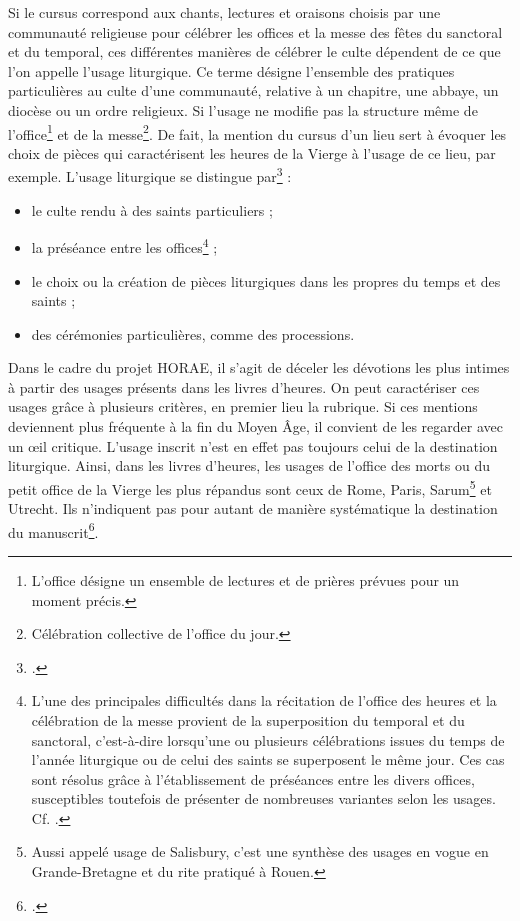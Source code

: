\documentclass[a4paper,12pt,twoside]{book}
\begin{document}
	Si le cursus correspond aux chants, lectures et oraisons choisis par une communauté religieuse pour célébrer les offices et la messe des fêtes du sanctoral et du temporal, ces différentes manières de célébrer le culte dépendent de ce que l'on appelle l'usage liturgique. Ce terme désigne l’ensemble des pratiques particulières au culte d’une communauté, relative à un chapitre, une abbaye, un diocèse ou un ordre religieux. Si l'usage ne modifie pas la structure même de l'office\footnote{L'office désigne un ensemble de lectures et de prières prévues pour un moment précis.} et de la messe\footnote{Célébration collective de l'office du jour.}. De fait, la mention du cursus d'un lieu sert à évoquer les choix de pièces qui caractérisent les heures de la Vierge à l'usage de ce lieu, par exemple. L'usage liturgique se distingue par\footcite{usages_lit} : 
	\begin{itemize}
	    \item le culte rendu à des saints particuliers ;
	    \item la préséance entre les offices\footnote{L'une des principales difficultés dans la récitation de l’office des heures et la célébration de la messe provient de la superposition du temporal et du sanctoral, c’est-à-dire lorsqu’une ou plusieurs célébrations issues du temps de l'année liturgique ou de celui des saints se superposent le même jour. Ces cas sont résolus grâce à l’établissement de préséances entre les divers offices, susceptibles toutefois de présenter de nombreuses variantes selon les usages. Cf. \cite{preseance_offices}.} ;
	    \item le choix ou la création de pièces liturgiques dans les propres du temps et des saints ;
	    \item des cérémonies particulières, comme des processions.
	\end{itemize}
	
	Dans le cadre du projet HORAE, il s'agit de déceler les dévotions les plus intimes à partir des usages présents dans les livres d'heures. On peut caractériser ces usages grâce à plusieurs critères, en premier lieu la rubrique. Si ces mentions deviennent plus fréquente à la fin du Moyen Âge, il convient de les regarder avec un œil critique. L'usage inscrit n'est en effet pas toujours celui de la destination liturgique. Ainsi, dans les livres d’heures, les usages de l’office des morts ou du petit office de la Vierge les plus répandus sont ceux de Rome, Paris, Sarum\footnote{Aussi appelé usage de Salisbury, c'est une synthèse des usages en vogue en Grande-Bretagne et du rite pratiqué à Rouen.} et Utrecht. Ils n'indiquent pas pour autant de manière systématique la destination du manuscrit\footcite{usages_lit}. 
	
\end{document}
